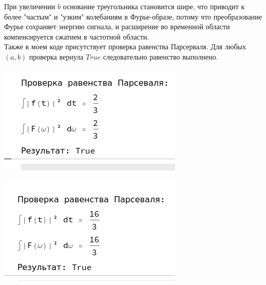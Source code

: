 \documentclass[a4paper,12pt]{article}
\begin{document}
При увеличении \( b \) основание треугольника становится шире, что приводит к более "частым" и "узким" колебаниям в Фурье-образе, потому что преобразование Фурье сохраняет энергию сигнала, и расширение во временной области компенсируется сжатием в частотной области. \\



Также в моем коде присутствует проверка равенства Парсерваля. Для любых \( (a, b) \) проверка вернула \( True\) следовательно равенство выполнено.

\begin{center}
\begin{minipage}{0.32\textwidth}
  \centering
  \includegraphics[width=\linewidth]{images/2P11.png}
\end{minipage}
\hfill
\begin{minipage}{0.32\textwidth}
  \centering
  \includegraphics[width=\linewidth]{images/2P22.png}
\end{minipage}

\end{center}
\end{document}
